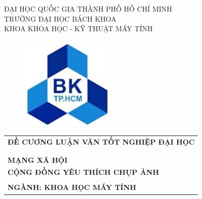 \begin{center}
	ĐẠI HỌC QUỐC GIA THÀNH PHỐ HỒ CHÍ MINH \\
	TRƯỜNG ĐẠI HỌC BÁCH KHOA \\
	KHOA KHOA HỌC - KỸ THUẬT MÁY TÍNH
\end{center}
	

\begin{figure}[h!]
	\begin{center}
		\includegraphics[width=4.5cm]{Images/bku_logo.jpg}
	\end{center}
\end{figure}
	    
\begin{center}
	\begin{tabular}{c}
		\multicolumn{1}{l}{\textbf{{\Large  ĐỀ CƯƠNG LUẬN VĂN TỐT NGHIỆP ĐẠI HỌC}}}            \\
		                                                                                                        \\
		\hline                                                                                                  
		                                                                                                        \\
		\multicolumn{1}{l}{\textbf{{\LARGE MẠNG XÃ HỘI}}} \\
		\multicolumn{1}{l}{\textbf{{\LARGE CỘNG ĐỒNG YÊU THÍCH CHỤP ẢNH}}} \\
		                                                                                                        \\
		\hline                                                                                                  
		\multicolumn{1}{l}{\textbf{\Large NGÀNH: KHOA HỌC MÁY TÍNH}}                                       
			                                                                                                        
	\end{tabular}
\end{center}
	    




